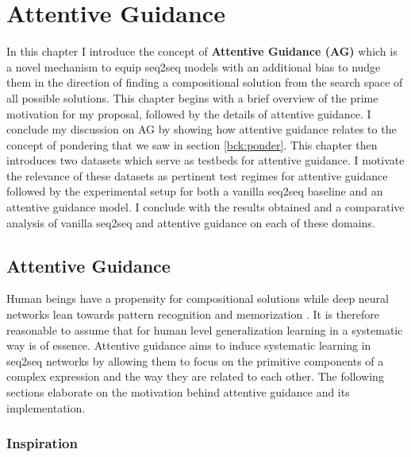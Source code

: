 \chapter{Attentive Guidance}\label{Chapter:proposals}

In this chapter I introduce the concept of \textbf{Attentive Guidance (AG)} which is a novel mechanism to equip seq2seq models with an additional bias to nudge them in the direction of finding a compositional solution from the search space of all possible solutions. This chapter begins with a brief overview of the prime motivation for my proposal, followed by the details of attentive guidance. I conclude my discussion on AG by showing how attentive guidance relates to the concept of pondering that we saw in section \ref{bck:ponder}. This chapter then introduces two datasets which serve as testbeds for attentive guidance. I motivate the relevance of these datasets as pertinent test regimes for attentive guidance followed by the experimental setup for both a vanilla seq2seq baseline and an attentive guidance model. I conclude with the results obtained and a comparative analysis of vanilla seq2seq and attentive guidance on each of these domains.


\section{Attentive Guidance}
Human beings have a propensity for compositional solutions \citep{NIPS2016_6130} while deep neural networks lean towards pattern recognition and memorization \citep{Marcus2018}. It is therefore reasonable to assume that for human level generalization learning in a systematic way is of essence. Attentive guidance aims to induce systematic learning in seq2seq networks by allowing them to focus on the primitive components of a complex expression and the way they are related to each other. The following sections elaborate on the motivation behind attentive guidance and its implementation.

\subsection{Inspiration} 

